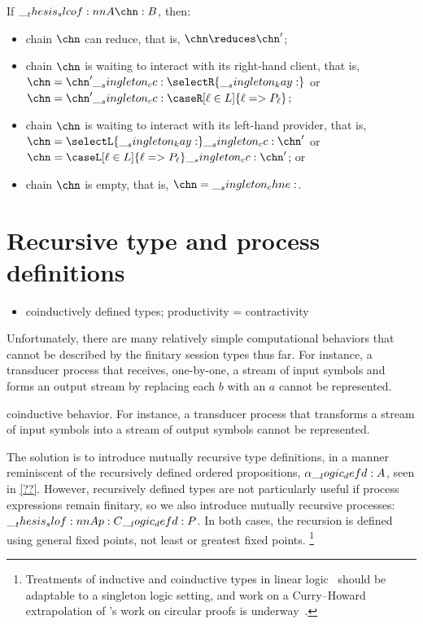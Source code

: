\begin{theorem}[Progress]
  If $\slcof{A |- \chn : B}$, then:
  \begin{itemize}
  \item chain $\chn$ can reduce, that is, $\chn \reduces \chn'$;
  \item chain $\chn$ is waiting to interact with its right-hand client, that is, $\chn = \chn' \cc \selectR{\kay}$ or $\chn = \chn' \cc \caseR[\ell \in L]{\ell => P_{\ell}}$;
  \item chain $\chn$ is waiting to interact with its left-hand provider, that is, $\chn = \selectL{\kay} \cc \chn'$ or $\chn = \caseL[\ell \in L]{\ell => P_{\ell}} \cc \chn'$; or
  \item chain $\chn$ is empty, that is, $\chn = \chne$.
  \end{itemize}
\end{theorem}


\section{Recursive type and process definitions}

\begin{itemize}
\item coinductively defined types; productivity = contractivity
\end{itemize}

Unfortunately, there are many relatively simple computational behaviors that cannot be described by the finitary session types thus far.
For instance, a transducer process that receives, one-by-one, a stream of input symbols and forms an output stream by replacing each $b$ with an $a$ cannot be represented.

coinductive behavior.
For instance, a transducer process that transforms a stream of input symbols into a stream of output symbols cannot be represented.

The solution is to introduce mutually recursive type definitions, in a manner reminiscent of the recursively defined ordered propositions, $\alpha \__logic_defd: A$, seen in \cref{??}.
However, recursively defined types are not particularly useful if process expressions remain finitary, so we also introduce mutually recursive processes: $\slof{A |- p : C} \defd P$.
In both cases, the recursion is defined using general fixed points, not least or greatest fixed points.%
\footnote{Treatments of inductive and coinductive types in linear logic~\parencite{Baelde:TCL12,Toninho+:TGC14} should be adaptable to a singleton logic setting, and work on a Curry--Howard extrapolation of \citeauthor{Fortier+Santocanale:CSL13}'s work on circular proofs\textcite*{Fortier+Santocanale:CSL13} is underway~\parencite{Derakhshan+Pfenning:LMCS19}.}


